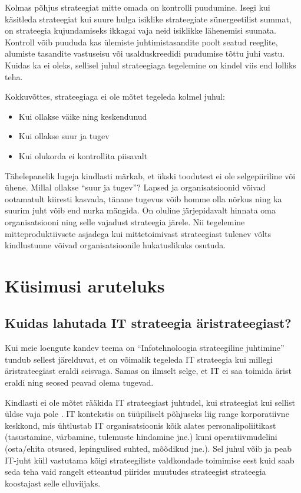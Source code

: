 \documentclass{tufte-book}
\begin{document}
Kolmas põhjus strateegiat mitte omada on kontrolli puudumine. Isegi kui käsitleda strateegiat kui suure hulga isiklike strateegiate sünergeetilist summat, on strateegia kujundamiseks ikkagai vaja neid isiklikke lähenemisi suunata. Kontroll võib puududa kas ülemiste juhtimistasandite poolt seatud reeglite, alumiste tasandite vastuseisu või usalduskreedidi puudumise tõttu juhi vastu. Kuidas ka ei oleks, sellisel juhul strateegiaga tegelemine on kindel viis end lolliks teha. 

Kokkuvõttes, strateegiaga ei ole mõtet tegeleda kolmel juhul:
\begin{itemize}
	\item Kui ollakse väike ning keskendunud
	\item Kui ollakse suur ja tugev
	\item Kui olukorda ei kontrollita piisavalt
\end{itemize}

Tähelepanelik lugeja kindlasti märkab, et ükski toodutest ei ole selgepiiriline või ühene. Millal ollakse \enquote{suur ja tugev}? Lapsed ja organisatsioonid võivad ootamatult kiiresti kasvada, tänane tugevus võib homme olla nõrkus ning ka suurim juht võib end nurka mängida. On oluline järjepidavalt hinnata oma organisatsiooni ning selle vajadust strateegia järele. Nii tegelemine mitteproduktiivsete asjadega kui mittetoimivast strateegiast tulenev võlts kindlustunne võivad organisatsioonile hukatuslikuks osutuda. 

\section{Küsimusi aruteluks}
\subsection{Kuidas lahutada IT strateegia äristrateegiast?}
\label{sec:strategy:q1}
Kui meie loengute kandev teema on \enquote{Infotehnoloogia strateegiline juhtimine} tundub sellest järelduvat, et on võimalik tegeleda IT strateegia kui millegi äristrateegiast eraldi seisvaga. Samas on ilmselt selge, et IT ei saa toimida ärist eraldi ning seosed peavad olema tugevad.

Kindlasti ei ole mõtet rääkida IT strateegiast juhtudel, kui strateegiat kui sellist üldse vaja pole . IT kontekstis on tüüpiliselt põhjuseks liig range korporatiivne keskkond, mis ühtlustab IT organisatsioonis kõik alates personalipoliitikast (tasustamine, värbamine, tulemuste hindamine jne.) kuni operatiivmudelini (osta/ehita otsused, lepingulised suhted, mõõdikud jne.). Sel juhul võib ja peab IT-juht küll vastutama kõigi strateegiliste valdkondade toimimise eest kuid saab seda teha vaid rangelt etteantud piirides muutudes strateegist strateegia koostajast selle elluviijaks.
\end{document}
